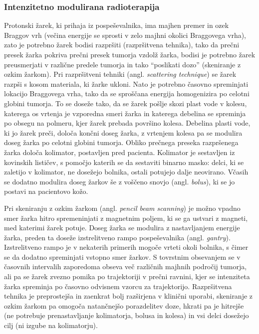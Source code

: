 \documentclass[a4paper,twoside,11pt]{article}
\begin{document}
	\subsubsection*{Intenzitetno modulirana radioterapija}
	\par{
	  Protonski žarek, ki prihaja iz pospeševalnika, ima majhen premer in ozek Braggov vrh (večina energije se sprosti v zelo majhni okolici Braggovega vrha), zato je potrebno žarek bodisi razpršiti (razpršitvena tehnika), tako da prečni presek žarka pokriva prečni presek tumorja vzdolž žarka, bodisi je potrebno žarek preusmerjati v različne predele tumorja in tako ``poslikati dozo'' (skeniranje z ozkim žarkom). Pri razpršitveni tehniki (angl. \emph{scattering technique}) se žarek razpši s kosom materiala, ki žarke ukloni. Nato je potrebno časovno spreminjati lokacijo Braggovega vrha, tako da se sproščana energija homogenizira po celotni globini tumorja. To se doseže tako, da se žarek pošlje skozi plast vode v kolesu, katerega os vrtenja je vzporedna smeri žarka in katerega debelina se spreminja po obsegu na polmeru, kjer žarek prebada površino kolesa. Debelina plasti vode, ki jo žarek preči, določa končni doseg žarka, z vrtenjem kolesa pa se modulira doseg žarka po celotni globini tumorja. Obliko prečnega preseka razpršenega žarka določa kolimator, postavljen pred pacienta. Kolimator je sestavljen iz kovinskih lističev, s pomočjo katerih se da sestaviti binarno masko: delci, ki se zaletijo v kolimator, ne dosežejo bolnika, ostali potujejo dalje neovirano. Včasih se dodatno modulira doseg žarkov še z voščeno snovjo (angl. \emph{bolus}), ki se jo postavi na pacientovo kožo.
	}
	\par{
	  Pri skeniranju z ozkim žarkom (angl. \emph{pencil beam scanning}) je možno vpadno smer žarka hitro spremeninjati z magnetnim poljem, ki se ga ustvari z magneti, med katerimi žarek potuje. Doseg žarka se modulira z nastavljanjem energije žarka, preden ta doseže izstrelitveno rampo pospeševalnika (angl. \emph{gantry}). Izstrelitveno rampo je v nekaterih primerih mogoče vrteti okoli bolnika, s čimer se da dodatno spreminjati vstopno smer žarkov. S tovrstnim obsevanjem se v časovnih intervalih zaporedoma obseva več različnih majhnih področij tumorja, ali pa se žarek zvezno pomika po trajektoriji v prečni ravnini, kjer se intenziteta žarka spreminja po časovno odvisnem vzorcu za trajektorijo. Razpršitvena tehnika je preprostejša in zaenkrat bolj razširjena v klinični uporabi, skeniranje z ozkim žarkom pa omogoča natančnejšo porazdelitev doze, hkrati pa je hitrejše (ne potrebuje prenastavljanje kolimatorja, bolusa in kolesa) in vsi delci dosežejo cilj (ni izgube na kolimatorju). \cite{schippers2011}
	}
\end{document}

